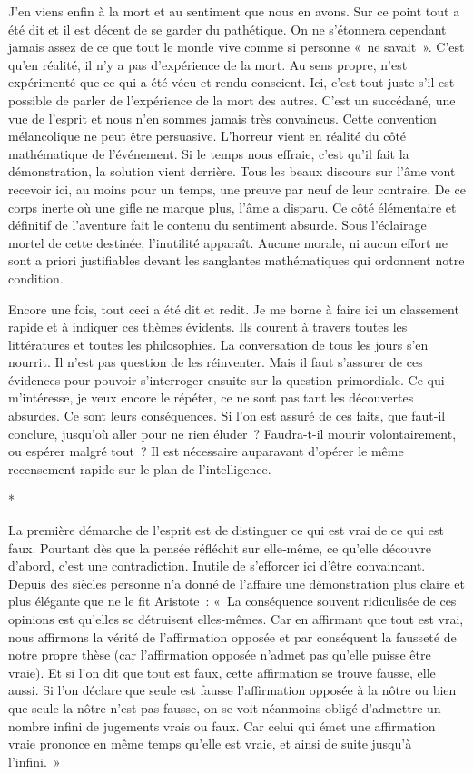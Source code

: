 \documentclass{book}
\begin{document}
J'en viens enfin à la mort et au sentiment que nous en avons. Sur ce point tout a été dit et il est décent de se garder du pathétique. On ne s'étonnera cependant jamais assez de ce que tout le monde vive comme si personne « ne savait ». C'est qu'en réalité, il n'y a pas d'expérience de la mort. Au sens propre, n'est expérimenté que ce qui a été vécu et rendu conscient. Ici, c'est tout juste s'il est possible de parler de l'expérience de la mort des autres. C'est un succédané, une vue de l'esprit et nous n'en sommes jamais très convaincus. Cette convention mélancolique ne peut être persuasive. L'horreur vient en réalité du côté mathématique de l'événement. Si le temps nous effraie, c'est qu'il fait la démonstration, la solution vient derrière. Tous les beaux discours sur l'âme vont recevoir ici, au moins pour un temps, une preuve par neuf de leur contraire. De ce corps inerte où une gifle ne marque plus, l'âme a disparu. Ce côté élémentaire et définitif de l'aventure fait le contenu du sentiment absurde. Sous l'éclairage mortel de cette destinée, l'inutilité apparaît. Aucune morale, ni aucun effort ne sont a priori justifiables devant les sanglantes mathématiques qui ordonnent notre condition.

Encore une fois, tout ceci a été dit et redit. Je me borne à faire ici un classement rapide et à indiquer ces thèmes évidents. Ils courent à travers toutes les littératures et toutes les philosophies. La conversation de tous les jours s'en nourrit. Il n'est pas question de les réinventer. Mais il faut s'assurer de ces évidences pour pouvoir s'interroger ensuite sur la question primordiale. Ce qui m'intéresse, je veux encore le répéter, ce ne sont pas tant les découvertes absurdes. Ce sont leurs conséquences. Si l'on est assuré de ces faits, que faut-il conclure, jusqu'où aller pour ne rien éluder ? Faudra-t-il mourir volontairement, ou espérer malgré tout ? Il est nécessaire auparavant d'opérer le même recensement rapide sur le plan de l'intelligence.

\begin{center}
*
\end{center}

La première démarche de l'esprit est de distinguer ce qui est vrai de ce qui est faux. Pourtant dès que la pensée réfléchit sur elle‑même, ce qu'elle découvre d'abord, c'est une contradiction. Inutile de s'efforcer ici d'être convaincant. Depuis des siècles personne n'a donné de l'affaire une démonstration plus claire et plus élégante que ne le fit Aristote : « La conséquence souvent ridiculisée de ces opinions est qu'elles se détruisent elles‑mêmes. Car en affirmant que tout est vrai, nous affirmons la vérité de l'affirmation opposée et par conséquent la fausseté de notre propre thèse (car l'affirmation opposée n'admet pas qu'elle puisse être vraie). Et si l'on dit que tout est faux, cette affirmation se trouve fausse, elle aussi. Si l'on déclare que seule est fausse l'affirmation opposée à la nôtre ou bien que seule la nôtre n'est pas fausse, on se voit néanmoins obligé d’admettre un nombre infini de jugements vrais ou faux. Car celui qui émet une affirmation vraie prononce en même temps qu'elle est vraie, et ainsi de suite jusqu'à l'infini. »
\end{document}

